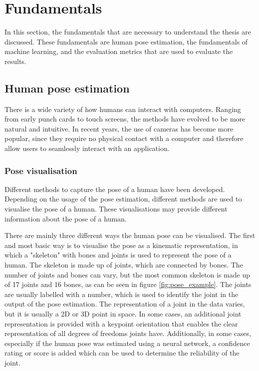 \section{Fundamentals}
\label{sec:fundamentals}

In this section, the fundamentals that are necessary to understand the thesis are discussed. These fundamentals are human pose estimation, the fundamentals of machine learning, and the evaluation metrics that are used to evaluate the results. 

\subsection{Human pose estimation}

There is a wide variety of how humans can interact with computers. Ranging from early punch cards to touch screens, the methods have evolved to be more natural and intuitive. In recent years, the use of cameras has become more popular, since they require no physical contact with a computer and therefore allow users to seamlessly interact with an application.

\subsubsection{Pose visualisation}

Different methods to capture the pose of a human have been developed. Depending on the usage of the pose estimation, different methods are used to visualise the pose of a human. These visualisations may provide different information about the pose of a human.

There are mainly three different ways the human pose can be visualised. The first and most basic way is to visualise the pose as a kinematic representation, in which a "skeleton" with bones and joints is used to represent the pose of a human. The skeleton is made up of joints, which are connected by bones. The number of joints and bones can vary, but the most common skeleton is made up of 17 joints and 16 bones, as can be seen in figure \ref{fig:pose_example}. The joints are usually labelled with a number, which is used to identify the joint in the output of the pose estimation. The representation of a joint in the data varies, but it is usually a 2D or 3D point in space. In some cases, an additional joint representation is provided with a keypoint orientation that enables the clear representation of all degrees of freedoms joints have\cite{KeypointOrientation}. Additionally, in some cases, especially if the human pose was estimated using a neural network, a confidence rating or score is added which can be used to determine the reliability of the joint.

